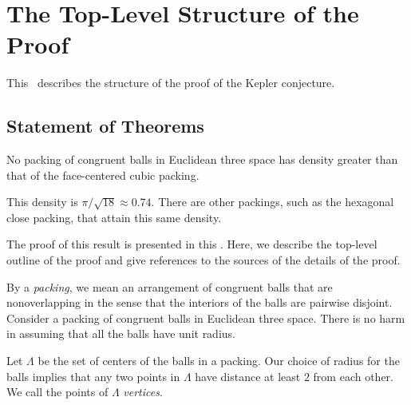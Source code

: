 



\label{part:form}
\chapter{The Top-Level Structure of the Proof}

\label{sec:overview}

This \chap\ describes the structure of the proof of the
 Kepler conjecture.


\section{Statement of Theorems}\label{sec:statement}


\begin{theorem}
\label{theorem:kepler}   No packing of congruent balls in
Euclidean three space has density greater than that of the
face-centered cubic packing.
\end{theorem}

\begin{remark}
This density is $\pi/\sqrt{18}\approx 0.74.$  There are other
packings, such as the hexagonal close packing, that attain this
same density.
\end{remark}

The proof of this result is presented in this \paper. Here, we
describe the top-level outline of the proof and give references to
the sources of the details of the proof.

By a {\it packing}, we mean an arrangement of congruent balls that
are nonoverlapping in the sense that the interiors of the balls are
pairwise disjoint. Consider a  packing of congruent
balls in Euclidean three space. There is no harm in assuming that
all the balls have unit radius. 

%

Let $\Lambda$ be the set of centers of the balls in a
packing. Our choice of radius for the
balls implies that any two points in $\Lambda$ have distance at
least $2$ from each other. We call the points of $\Lambda$ {\it
{} vertices}.

